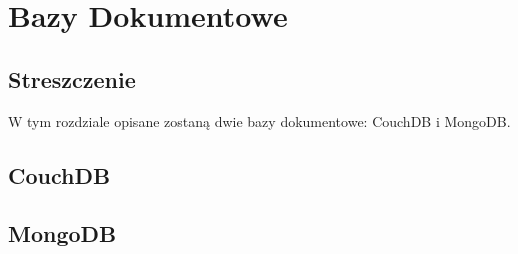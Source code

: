\chapter{Bazy Dokumentowe}

\section*{Streszczenie}
W tym rozdziale opisane zostaną dwie bazy dokumentowe: CouchDB i MongoDB.

\section{CouchDB}
\label{sec:couchdb}

\section{MongoDB}
\label{sec:mongodb}